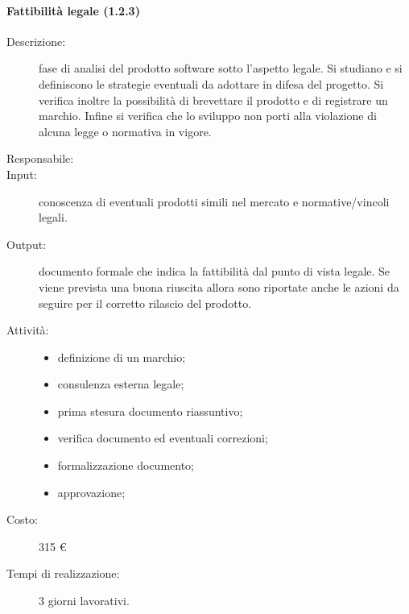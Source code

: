 \paragraph{Fattibilit\`{a} legale (1.2.3)}
\begin{description}
\item[Descrizione:] fase di analisi del prodotto software sotto l'aspetto legale. Si studiano e si definiscono le strategie eventuali da adottare in difesa del progetto. Si verifica inoltre la possibilit\`{a} di brevettare il prodotto e di registrare un marchio. Infine si verifica che lo sviluppo non porti alla violazione di alcuna legge o normativa in vigore.
\item[Responsabile:]
\item[Input:] conoscenza di eventuali prodotti simili nel mercato e normative/vincoli legali.
\item[Output:] documento formale che indica la fattibilit\`{a} dal punto di vista legale. Se viene prevista una buona riuscita allora sono riportate anche le azioni da seguire per il corretto rilascio del prodotto.
\item[Attivit\`{a}:] 
\begin{center}
\begin{itemize}
\item definizione di un marchio;
\item consulenza esterna legale;
\item prima stesura documento riassuntivo;
\item verifica documento ed eventuali correzioni;
\item formalizzazione documento;
\item approvazione;
\end{itemize}
\end{center}
\item[Costo:] 315 \euro{}
\item[Tempi di realizzazione:] 3 giorni lavorativi.
\end{description}

